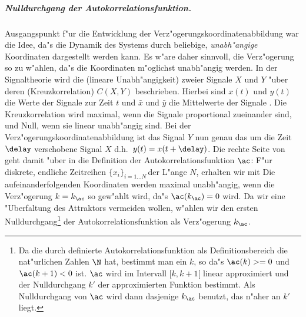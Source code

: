 \subparagraph{Nulldurchgang der Autokorrelationsfunktion.} Ausgangspunkt f"ur die
Entwicklung der Verz"ogerungskoordinatenabbildung war die Idee, da"s die Dynamik des
Systems durch beliebige, \emph{unabh"angige} Koordinaten dargestellt werden kann. Es w"are
daher sinnvoll, die Verz"ogerung so zu w"ahlen, da"s die Koordinaten m"oglichst
unabh"angig werden. In der Signaltheorie wird die \begriff(lineare Unabh"angigkeit) zweier
Signale $X$ und $Y$ "uber deren \begriff(Kreuzkorrelation) $C(X,Y)$ beschrieben.
 Hierbei sind $x(t)$ und $y(t)$ die Werte der Signale zur
Zeit $t$ und $\bar x$ und $\bar y$ die Mittelwerte der Signale \footnotemark. Die
Kreuzkorrelation wird maximal, wenn die Signale proportional zueinander sind, und Null,
wenn sie linear unabh"angig sind. Bei der Verz"ogerungskoordinatenabbildung ist das Signal
$Y$ nun genau das um die Zeit $\delay$ verschobene Signal $X$ d.h.\ $y(t)=x(t+\delay)$.
Die rechte Seite von  geht damit "uber in die Definition der
Autokorrelationsfunktion $\ac$: 
 F"ur diskrete, endliche Zeitreihen
$\{x_i\}_{i=1\dots N}\,$der L"ange $N$, erhalten wir
 mit
 Die aufeinanderfolgenden Koordinaten
werden maximal unabh"angig, wenn die Verz"ogerung $k=k_\ac$ so gew"ahlt wird, da"s
$\ac(k_\ac)=0$ wird. Da wir eine "Uberfaltung des Attraktors vermeiden wollen, w"ahlen wir
den ersten Nulldurchgang\footnote{Da die durch  definierte
  Autokorrelationsfunktion als Definitionsbereich die nat"urlichen Zahlen $\N$ hat,
  bestimmt man ein $k$, so da"s $\ac(k)>=0$ und $\ac(k+1)<0$ ist. $\ac$ wird im Intervall
  $[k,k+1[$ linear approximiert und der Nulldurchgang $k'$ der approximierten Funktion
  bestimmt. Als Nulldurchgang von $\ac$ wird dann dasjenige $k_\ac$ benutzt, das n"aher an
  $k'$ liegt.}  der Autokorrelationsfunktion als Verz"ogerung $k_\ac$. 

